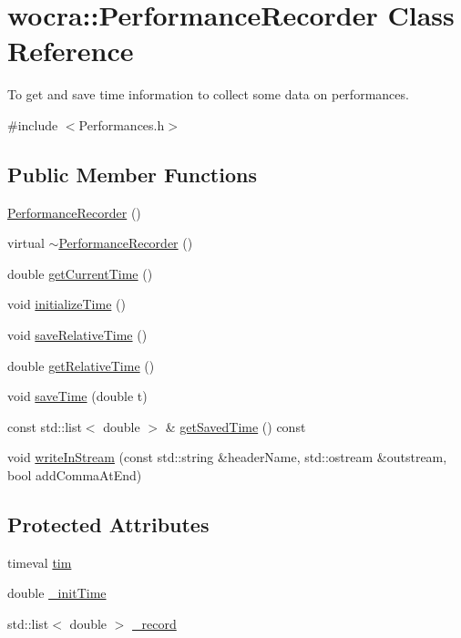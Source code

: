 \hypertarget{classwocra_1_1PerformanceRecorder}{}\section{wocra\+:\+:Performance\+Recorder Class Reference}
\label{classwocra_1_1PerformanceRecorder}


To get and save time information to collect some data on performances.  




{\ttfamily \#include $<$Performances.\+h$>$}

\subsection*{Public Member Functions}
\begin{DoxyCompactItemize}
\item 
\hyperlink{classwocra_1_1PerformanceRecorder_afcefa140d40279c65b10a38ff5c6549b}{Performance\+Recorder} ()
\item 
virtual \hyperlink{classwocra_1_1PerformanceRecorder_ae686b34e1d7e0e3a80c7ee0df012e441}{$\sim$\+Performance\+Recorder} ()
\item 
double \hyperlink{classwocra_1_1PerformanceRecorder_aca4cee19319252b823be15e1f217825e}{get\+Current\+Time} ()
\item 
void \hyperlink{classwocra_1_1PerformanceRecorder_af1e2e645007a910e8d3af72f1d6aeaeb}{initialize\+Time} ()
\item 
void \hyperlink{classwocra_1_1PerformanceRecorder_af17f8912dee957329f961eec5fb45e9f}{save\+Relative\+Time} ()
\item 
double \hyperlink{classwocra_1_1PerformanceRecorder_a170b49e0d8399c21184e706ce915a446}{get\+Relative\+Time} ()
\item 
void \hyperlink{classwocra_1_1PerformanceRecorder_a97a89d1cf9f994da4059cba8cb3b21ee}{save\+Time} (double t)
\item 
const std\+::list$<$ double $>$ \& \hyperlink{classwocra_1_1PerformanceRecorder_a7e27ca829190c70a8a3ce782c409a8ce}{get\+Saved\+Time} () const
\item 
void \hyperlink{classwocra_1_1PerformanceRecorder_a9b2a77a8d2598dbf76eb578b43b9a17d}{write\+In\+Stream} (const std\+::string \&header\+Name, std\+::ostream \&outstream, bool add\+Comma\+At\+End)
\end{DoxyCompactItemize}
\subsection*{Protected Attributes}
\begin{DoxyCompactItemize}
\item 
timeval \hyperlink{classwocra_1_1PerformanceRecorder_ad66f50acd0ca84db58c753406e25da75}{tim}
\item 
double \hyperlink{classwocra_1_1PerformanceRecorder_a24a1f84e36d1a53d93fc88f4ec852b18}{\+\_\+init\+Time}
\item 
std\+::list$<$ double $>$ \hyperlink{classwocra_1_1PerformanceRecorder_aafecfdfef2e3b0d987cbb394a185e741}{\+\_\+record}
\end{DoxyCompactItemize}


